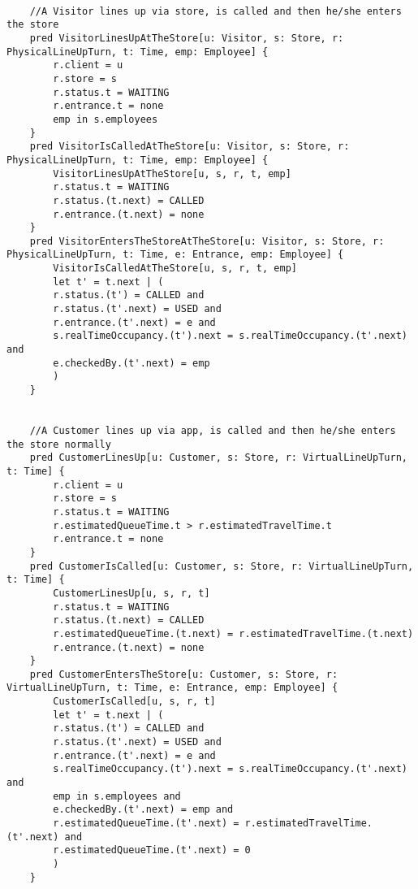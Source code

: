 \begin{lstlisting}[language=alloy]
    
    //A Visitor lines up via store, is called and then he/she enters the store
    pred VisitorLinesUpAtTheStore[u: Visitor, s: Store, r: PhysicalLineUpTurn, t: Time, emp: Employee] {
        r.client = u
        r.store = s
        r.status.t = WAITING
        r.entrance.t = none
        emp in s.employees
    }
    pred VisitorIsCalledAtTheStore[u: Visitor, s: Store, r: PhysicalLineUpTurn, t: Time, emp: Employee] {
        VisitorLinesUpAtTheStore[u, s, r, t, emp]
        r.status.t = WAITING
        r.status.(t.next) = CALLED
        r.entrance.(t.next) = none
    }
    pred VisitorEntersTheStoreAtTheStore[u: Visitor, s: Store, r: PhysicalLineUpTurn, t: Time, e: Entrance, emp: Employee] {
        VisitorIsCalledAtTheStore[u, s, r, t, emp]
        let t' = t.next | (
        r.status.(t') = CALLED and
        r.status.(t'.next) = USED and
        r.entrance.(t'.next) = e and
        s.realTimeOccupancy.(t').next = s.realTimeOccupancy.(t'.next) and 
        e.checkedBy.(t'.next) = emp
        )
    }


    //A Customer lines up via app, is called and then he/she enters the store normally
    pred CustomerLinesUp[u: Customer, s: Store, r: VirtualLineUpTurn, t: Time] {
        r.client = u
        r.store = s
        r.status.t = WAITING
        r.estimatedQueueTime.t > r.estimatedTravelTime.t
        r.entrance.t = none
    }
    pred CustomerIsCalled[u: Customer, s: Store, r: VirtualLineUpTurn, t: Time] {
        CustomerLinesUp[u, s, r, t]
        r.status.t = WAITING
        r.status.(t.next) = CALLED
        r.estimatedQueueTime.(t.next) = r.estimatedTravelTime.(t.next)
        r.entrance.(t.next) = none
    }
    pred CustomerEntersTheStore[u: Customer, s: Store, r: VirtualLineUpTurn, t: Time, e: Entrance, emp: Employee] {
        CustomerIsCalled[u, s, r, t]
        let t' = t.next | (
        r.status.(t') = CALLED and
        r.status.(t'.next) = USED and
        r.entrance.(t'.next) = e and
        s.realTimeOccupancy.(t').next = s.realTimeOccupancy.(t'.next) and
        emp in s.employees and 
        e.checkedBy.(t'.next) = emp and
        r.estimatedQueueTime.(t'.next) = r.estimatedTravelTime.(t'.next) and
        r.estimatedQueueTime.(t'.next) = 0
        )
    }



\end{lstlisting}

